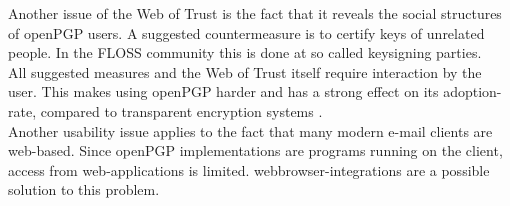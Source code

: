 Another issue of the Web of Trust is the fact that it reveals the social structures of openPGP users. A suggested countermeasure is to certify keys of unrelated people. In the FLOSS community this is done at so called keysigning parties.  \\

All suggested measures and the Web of Trust itself require interaction by the user. This makes using openPGP harder and has a strong effect on its adoption-rate, compared to transparent encryption systems \cite{Green2014}. \\

Another usability issue applies to the fact that many modern e-mail clients are web-based. Since openPGP implementations are programs running on the client, access from web-applications is limited. webbrowser-integrations are a possible solution to this problem. 














